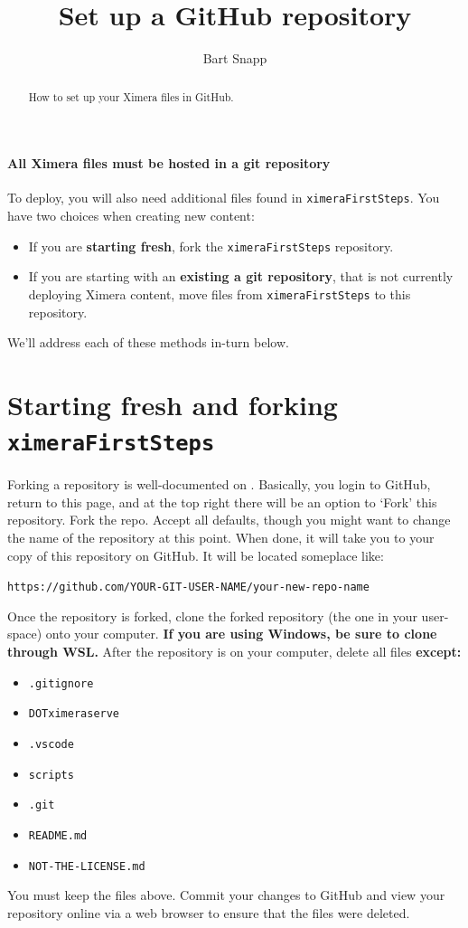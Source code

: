 \documentclass{ximera}
\title{Set up a GitHub repository}
\author{Bart Snapp}
\begin{document}
\begin{abstract}
  How to set up your Ximera files in GitHub.
\end{abstract}
\maketitle

\paragraph{All Ximera files must be hosted in a git repository} To deploy, you
will also need	additional
files found in \verb!ximeraFirstSteps!. You have two choices when creating new
content:
\begin{itemize}
  \item If you are \textbf{starting fresh}, fork the \texttt{ximeraFirstSteps}
        repository.
  \item If you are starting with an \textbf{existing a git repository}, that is
        not currently deploying Ximera content, move files
        from \texttt{ximeraFirstSteps} to this repository.
\end{itemize}
We'll address each of these methods in-turn below.

\section{Starting fresh and forking \texttt{ximeraFirstSteps}}

Forking a repository is well-documented on
.
Basically, you login to GitHub, return to this page, and at the top right there
will be an option to `Fork' this repository. Fork the repo. Accept all
defaults, though you might want to change the name of the repository at this
point. When done, it will take you to
your copy of this repository on GitHub. It will be located someplace like:
\begin{center}
  \texttt{https://github.com/YOUR-GIT-USER-NAME/your-new-repo-name}
\end{center}
Once the repository is forked, clone the forked repository (the one in your
user-space) onto your computer. \textbf{If you are using Windows, be sure to
  clone through WSL.}
After the repository is on your computer, delete all files \textbf{except:}
\begin{itemize}
  \item \texttt{.gitignore}
  \item \texttt{DOTximeraserve}
  \item \texttt{.vscode}
  \item \texttt{scripts}
  \item \texttt{.git}
  \item \texttt{README.md}
  \item \texttt{NOT-THE-LICENSE.md}
\end{itemize}
You must keep the files above.	Commit your changes to GitHub and view your
repository online via a web browser to ensure that the files were deleted.
\end{document}

